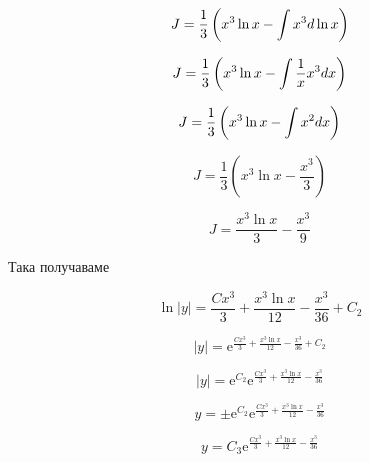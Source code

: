 \documentclass{scrartcl}
\begin{document}
$$J = \dfrac{1}{3}\left( x^3\ln{x}-\int x^3\space d\ln{x}\right)$$

$$J = \dfrac{1}{3}\left( x^3\ln{x}-\int \dfrac{1}{x}x^3\space dx\right)$$

$$J = \dfrac{1}{3}\left( x^3\ln{x}-\int x^2\space dx\right)$$

$$J = \dfrac{1}{3}\left( x^3\ln{x}-\dfrac{x^3}{3}\right)$$

$$J = \dfrac{x^3\ln{x}}{3} - \dfrac{x^3}{9}$$

Така получаваме

$$\ln{|y|} = \dfrac{Cx^3}{3} + \dfrac{x^3\ln{x}}{12} - \dfrac{x^3}{36} + C_2$$

$$|y| = \mathrm{e}^{\frac{Cx^3}{3} + \frac{x^3\ln{x}}{12} - \frac{x^3}{36} + C_2}$$

$$|y| = \mathrm{e}^{C_2}\mathrm{e}^{\frac{Cx^3}{3} + \frac{x^3\ln{x}}{12} - \frac{x^3}{36}}$$

$$y = \pm\mathrm{e}^{C_2}\mathrm{e}^{\frac{Cx^3}{3} + \frac{x^3\ln{x}}{12} - \frac{x^3}{36}}$$

$$y = C_3\mathrm{e}^{\frac{Cx^3}{3} + \frac{x^3\ln{x}}{12} - \frac{x^3}{36}}$$
\end{document}
